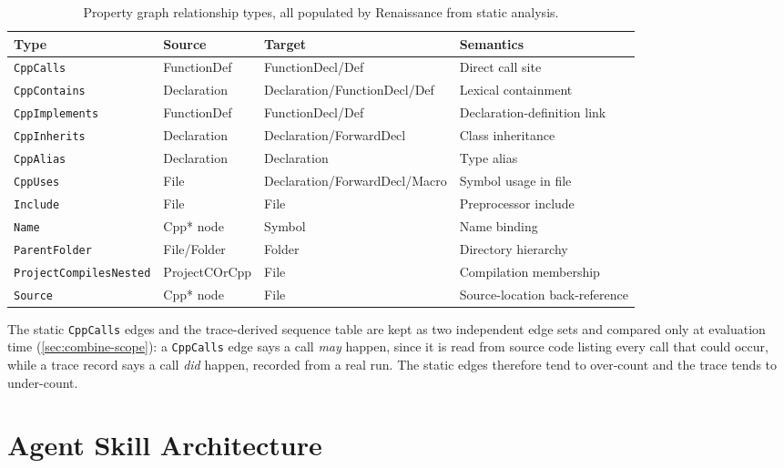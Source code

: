 \begin{table}[htb]
\centering
\caption{Property graph relationship types, all populated by Renaissance
  from static analysis.}
\label{tab:edge-types}
\small
\begin{tabular}{@{} l l l p{5.5cm} @{}}
\toprule
\textbf{Type} & \textbf{Source} & \textbf{Target} & \textbf{Semantics} \\
\midrule
\texttt{CppCalls}       & FunctionDef & FunctionDecl/Def & Direct call site \\
\texttt{CppContains}    & Declaration & Declaration/FunctionDecl/Def & Lexical containment \\
\texttt{CppImplements}  & FunctionDef & FunctionDecl/Def & Declaration-definition link \\
\texttt{CppInherits}    & Declaration & Declaration/ForwardDecl & Class inheritance \\
\texttt{CppAlias}       & Declaration & Declaration & Type alias \\
\texttt{CppUses}        & File        & Declaration/ForwardDecl/Macro & Symbol usage in file \\
\texttt{Include}        & File        & File & Preprocessor include \\
\texttt{Name}           & Cpp* node   & Symbol & Name binding \\
\texttt{ParentFolder}   & File/Folder & Folder & Directory hierarchy \\
\texttt{ProjectCompilesNested} & ProjectCOrCpp & File & Compilation membership \\
\texttt{Source}         & Cpp* node   & File & Source-location back-reference \\
\bottomrule
\end{tabular}
\end{table}

The static \texttt{CppCalls} edges and the trace-derived sequence table
are kept as two independent edge sets and compared only at evaluation
time (\cref{sec:combine-scope}): a \texttt{CppCalls} edge says a call
\emph{may} happen, since it is read from source code listing every call
that could occur, while a trace record says a call \emph{did} happen,
recorded from a real run. The static edges therefore tend to over-count
and the trace tends to under-count.

\section{Agent Skill Architecture}\label{sec:skill-design}

